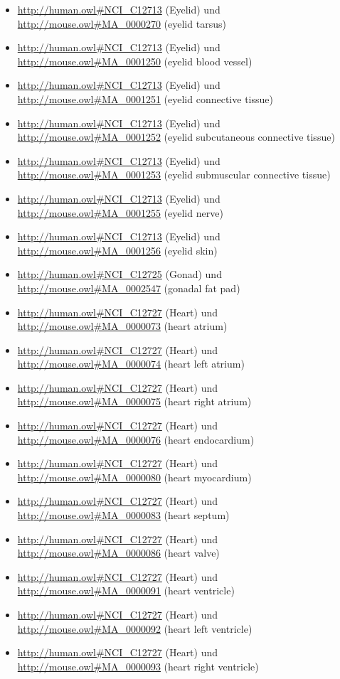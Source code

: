 \begin{itemize}
	\item \url{http://human.owl#NCI_C12713} (Eyelid) und \url{http://mouse.owl#MA_0000270} (eyelid tarsus)
	\item \url{http://human.owl#NCI_C12713} (Eyelid) und \url{http://mouse.owl#MA_0001250} (eyelid blood vessel)
	\item \url{http://human.owl#NCI_C12713} (Eyelid) und \url{http://mouse.owl#MA_0001251} (eyelid connective tissue)
	\item \url{http://human.owl#NCI_C12713} (Eyelid) und \url{http://mouse.owl#MA_0001252} (eyelid subcutaneous connective tissue)
	\item \url{http://human.owl#NCI_C12713} (Eyelid) und \url{http://mouse.owl#MA_0001253} (eyelid submuscular connective tissue)
	\item \url{http://human.owl#NCI_C12713} (Eyelid) und \url{http://mouse.owl#MA_0001255} (eyelid nerve)
	\item \url{http://human.owl#NCI_C12713} (Eyelid) und \url{http://mouse.owl#MA_0001256} (eyelid skin)
	\item \url{http://human.owl#NCI_C12725} (Gonad) und \url{http://mouse.owl#MA_0002547} (gonadal fat pad)
	\item \url{http://human.owl#NCI_C12727} (Heart) und \url{http://mouse.owl#MA_0000073} (heart atrium)
	\item \url{http://human.owl#NCI_C12727} (Heart) und \url{http://mouse.owl#MA_0000074} (heart left atrium)
	\item \url{http://human.owl#NCI_C12727} (Heart) und \url{http://mouse.owl#MA_0000075} (heart right atrium)
	\item \url{http://human.owl#NCI_C12727} (Heart) und \url{http://mouse.owl#MA_0000076} (heart endocardium)
	\item \url{http://human.owl#NCI_C12727} (Heart) und \url{http://mouse.owl#MA_0000080} (heart myocardium)
	\item \url{http://human.owl#NCI_C12727} (Heart) und \url{http://mouse.owl#MA_0000083} (heart septum)
	\item \url{http://human.owl#NCI_C12727} (Heart) und \url{http://mouse.owl#MA_0000086} (heart valve)
	\item \url{http://human.owl#NCI_C12727} (Heart) und \url{http://mouse.owl#MA_0000091} (heart ventricle)
	\item \url{http://human.owl#NCI_C12727} (Heart) und \url{http://mouse.owl#MA_0000092} (heart left ventricle)
	\item \url{http://human.owl#NCI_C12727} (Heart) und \url{http://mouse.owl#MA_0000093} (heart right ventricle)

\end{itemize}
